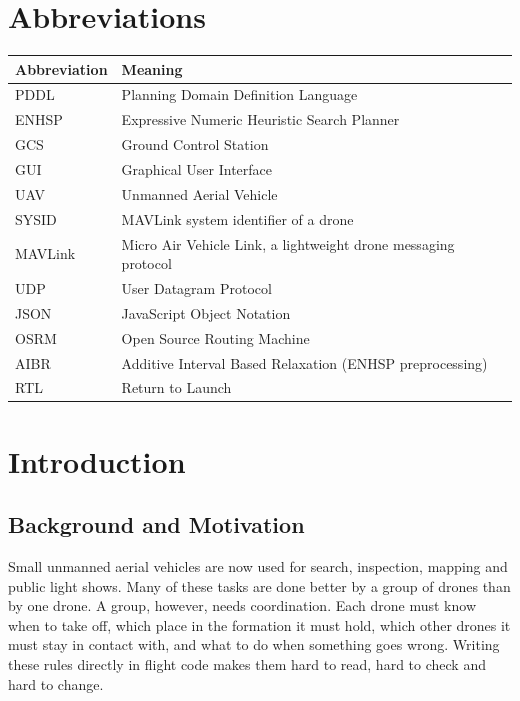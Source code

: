 \documentclass[11pt,a4paper,oneside]{report}
\newlength{\tocgap}\setlength{\tocgap}{1.0em}
\newcommand{\frontentry}[2]{\addvspace{\tocgap}\noindent\textbf{#1}\hfill\textbf{#2}\par}
\newcommand{\addfront}[1]{\addtocontents{toc}{\protect\frontentry{#1}{\thepage}}}
\begin{document}
\chapter*{Abbreviations}
\addfront{ABBREVIATIONS}
\begin{center}
\begin{tabular}{@{}p{}p{}@{}}
\toprule
\textbf{Abbreviation} & \textbf{Meaning} \\
\midrule
PDDL   & Planning Domain Definition Language \\
ENHSP  & Expressive Numeric Heuristic Search Planner \\
GCS    & Ground Control Station \\
GUI    & Graphical User Interface \\
UAV    & Unmanned Aerial Vehicle \\
SYSID  & MAVLink system identifier of a drone \\
MAVLink& Micro Air Vehicle Link, a lightweight drone messaging protocol \\
UDP    & User Datagram Protocol \\
JSON   & JavaScript Object Notation \\
OSRM   & Open Source Routing Machine \\
AIBR   & Additive Interval Based Relaxation (ENHSP preprocessing) \\
RTL    & Return to Launch \\
\bottomrule
\end{tabular}
\end{center}

\clearpage
{}

\chapter{Introduction}

\section{Background and Motivation}
Small unmanned aerial vehicles are now used for search, inspection, mapping and public light
shows. Many of these tasks are done better by a group of drones than by one drone. A group,
however, needs coordination. Each drone must know when to take off, which place in the
formation it must hold, which other drones it must stay in contact with, and what to do when
something goes wrong. Writing these rules directly in flight code makes them hard to read, hard
to check and hard to change.
\end{document}
